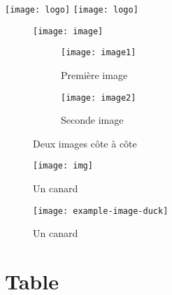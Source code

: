 \documentclass{article}
\begin{document}
\begin{multicols*}{3}
\begin{latexcode}
    \graphicspath{ {images/} } %
    \texttt{[image: logo]} %
    \texttt{[image: logo]} %

    \begin{wrapfigure}{r}{0.25\textwidth}
        \centering
        \texttt{[image: image]}
    \end{wrapfigure} %

    \begin{figure}[H]
        \centering
        \begin{subfigure}{0.45\textwidth}
            \texttt{[image: image1]}
            \caption{Première image}
        \end{subfigure}
        \begin{subfigure}{0.45\textwidth}
            \texttt{[image: image2]}
            \caption{Seconde image}
        \end{subfigure}
        \caption{Deux images côte à côte}
    \end{figure}
\end{latexcode}
\begin{multicols*}{2}

    \begin{latexcode}
        \begin{figure}[H]
            \centering
            \texttt{[image: img]}
            \caption[Canard]{Un canard}
            \label{fig:right-triangle}
        \end{figure}
    \end{latexcode}

    \begin{figure}[H]
        \centering
        \texttt{[image: example-image-duck]}
        \caption[Canard]{Un canard}
        \label{fig:right-triangle}
    \end{figure}

\end{multicols*}

\section*{Table}

\end{multicols*}
\end{document}
